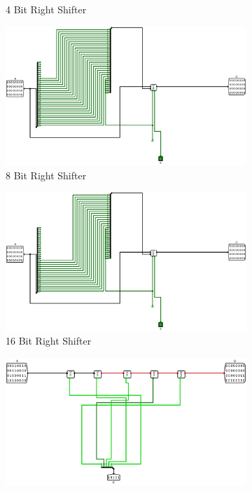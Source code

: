 \documentclass[12pt]{article}
\begin{document}
\begin{figure}[H]
\begin{subfigure}[b]{0.3\textwidth}
        \caption{4 Bit Right Shifter}
        \label{fig:4rightshift}
    \end{subfigure}
    \newline
    \newline
    \begin{subfigure}[b]{0.3\textwidth}
        \includegraphics[width=\textwidth]{Images/8RightShift.png}
        \caption{8 Bit Right Shifter}
        \label{fig:8rightshift}
    \end{subfigure}
    \hfill
    \begin{subfigure}[b]{0.3\textwidth}
        \includegraphics[width=\textwidth]{Images/16RightShift.png}
        \caption{16 Bit Right Shifter}
        \label{fig:16rightshift}
    \end{subfigure}
    \hfill
    \begin{subfigure}[b]{0.3\textwidth}
        \includegraphics[width=\textwidth]{Images/ArbRightShift.png}

\end{subfigure}
\end{figure}
\end{document}
